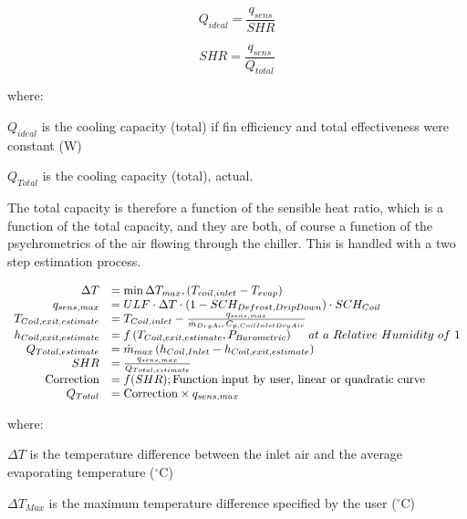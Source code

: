 \begin{equation}
  Q_{ideal} = \frac{q_{sens}}{SHR}
\end{equation}

\begin{equation}
  SHR = \frac{q_{sens}}{Q_{total}}
\end{equation}

where:

\({Q_{ideal}}\) is the cooling capacity (total) if fin efficiency and total effectiveness were constant (W)

\({Q_{Total}}\) is the cooling capacity (total), actual.

The total capacity is therefore a function of the sensible heat ratio, which is a function of the total capacity, and they are both, of course a function of the psychrometrics of the air flowing through the chiller. This is handled with a two step estimation process.

\begin{equation}
  \begin{array}{rl}
                  \Delta T &= \min{ \Delta T_{max},\left(T_{coil,inlet} - T_{evap}\right)} \\
              q_{sens,max} &= ULF \cdot \Delta T \cdot \left(1 - SCH_{Defrost,DripDown}\right) \cdot SCH_{Coil} \\ 
    T_{Coil,exit,estimate} &= T_{Coil,inlet} - \frac{q_{sens,max}}{\dot{m}_{DryAir} C_{p,Coil Inlet Dry Air}} \\
    h_{Coil,exit,estimate} &= f\left(T_{Coil,exit,estimate},P_{Barometric}\right)~~~~at~a~Relative~Humidity~of~1 \\
        Q_{Total,estimate} &= \dot{m}_{max}\left(h_{Coil,Inlet} - h_{Coil,exit,estimate}\right) \\
                       SHR &= \frac{q_{sens,max}}{Q_{Total,estimate}} \\
         \text{Correction} &= f(SHR);\text{Function input by user, linear or quadratic curve} \\
                 Q_{Total} &= \text{Correction} \times q_{sens,max}
  \end{array}
\end{equation}

where:

\(\Delta T\) is the temperature difference between the inlet air and the average evaporating temperature (\(^{\circ}\)C)

\(\Delta T{}_{Max}\) is the maximum temperature difference specified by the user (\(^{\circ}\)C)

